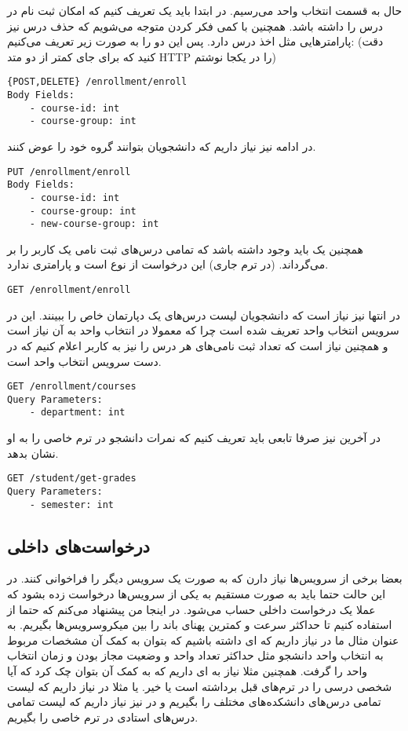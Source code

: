 حال به قسمت انتخاب واحد می‌رسیم. در ابتدا باید یک
تعریف کنیم که امکان ثبت نام در درس را داشته باشد. همچنین با کمی فکر کردن متوجه می‌شویم که حذف
درس نیز پارامتر‌هایی مثل اخذ درس دارد. پس این دو را به صورت زیر تعریف می‌کنیم:
(دقت کنید که برای جای کمتر از دو متد HTTP را در یکجا نوشتم)
\begin{latin}
\begin{lstlisting}
{POST,DELETE} /enrollment/enroll
Body Fields:
    - course-id: int
    - course-group: int
\end{lstlisting}
\end{latin}
در ادامه نیز نیاز داریم که دانشجویان بتوانند گروه خود را عوض کنند.
\begin{latin}
\begin{lstlisting}
PUT /enrollment/enroll
Body Fields:
    - course-id: int
    - course-group: int
    - new-course-group: int
\end{lstlisting}
\end{latin}
همچنین یک
باید وجود داشته باشد که تمامی درس‌های ثبت نامی یک کاربر را بر می‌گرداند.
(در ترم جاری)
این درخواست از نوع
است و پارامتری ندارد.
\begin{latin}
\begin{lstlisting}
GET /enrollment/enroll
\end{lstlisting}
\end{latin}
در انتها نیز نیاز است که دانشجویان لیست درس‌های یک دپارتمان خاص را ببینند. این
در سرویس انتخاب واحد تعریف شده است چرا که معمولا در انتخاب واحد به آن نیاز است و همچنین نیاز است
که تعداد ثبت نامی‌های هر درس را نیز به کاربر اعلام کنیم که در دست سرویس انتخاب واحد است.
\begin{latin}
\begin{lstlisting}
GET /enrollment/courses
Query Parameters:
    - department: int
\end{lstlisting}
\end{latin}
در آخرین
نیز صرفا تابعی باید تعریف کنیم که نمرات دانشجو در ترم خاصی را به او نشان بدهد.
\begin{latin}
\begin{lstlisting}
GET /student/get-grades
Query Parameters:
    - semester: int
\end{lstlisting}
\end{latin}
\subsection{درخواست‌های داخلی}
بعضا برخی از سرویس‌ها نیاز دارن که به صورت
یک سرویس دیگر را فراخوانی کنند. در این حالت حتما باید به صورت مستقیم به یکی از سرویس‌ها درخواست
زده بشود که عملا یک درخواست داخلی حساب می‌شود. در اینجا من پیشنهاد می‌کنم که حتما از
استفاده کنیم تا حداکثر سرعت و کمترین پهنای باند را بین میکروسرویس‌ها بگیریم.
به عنوان مثال ما در
نیاز داریم که
ای
داشته باشیم که بتوان به کمک آن مشخصات مربوط به انتخاب واحد دانشجو مثل حداکثر تعداد واحد و
وضعیت مجاز بودن و زمان انتخاب واحد را گرفت. همچنین مثلا نیاز به
ای
داریم که به کمک آن بتوان چک کرد که آیا شخصی درسی را در ترم‌های قبل برداشته است یا خیر.
یا مثلا در
نیاز داریم که لیست تمامی درس‌های دانشکده‌های مختلف را بگیریم و در
نیز نیاز داریم که لیست تمامی درس‌های استادی در ترم خاصی را بگیریم.